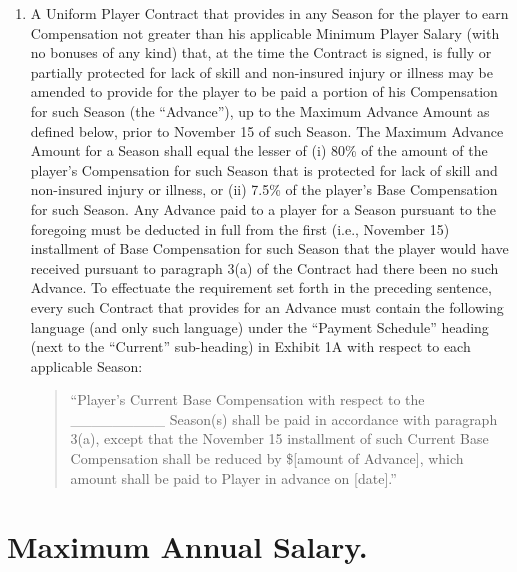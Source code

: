 \documentclass[
]{book}
\begin{document}
\begin{enumerate}
\item
  A Uniform Player Contract that provides in any Season for the player to earn Compensation not greater than his applicable Minimum Player Salary (with no bonuses of any kind) that, at the time the Contract is signed, is fully or partially protected for lack of skill and non-insured injury or illness may be amended to provide for the player to be paid a portion of his Compensation for such Season (the ``Advance''), up to the Maximum Advance Amount as defined below, prior to November 15 of such Season. The Maximum Advance Amount for a Season shall equal the lesser of (i) 80\% of the amount of the player's Compensation for such Season that is protected for lack of skill and non-insured injury or illness, or (ii) 7.5\% of the player's Base Compensation for such Season. Any Advance paid to a player for a Season pursuant to the foregoing must be deducted in full from the first (i.e., November 15) installment of Base Compensation for such Season that the player would have received pursuant to paragraph 3(a) of the Contract had there been no such Advance. To effectuate the requirement set forth in the preceding sentence, every such Contract that provides for an Advance must contain the following language (and only such language) under the ``Payment Schedule'' heading (next to the ``Current'' sub-heading) in Exhibit 1A with respect to each applicable Season:

  \begin{quote}
  ``Player's Current Base Compensation with respect to the \_\_\_\_\_\_\_\_\_ Season(s) shall be paid in accordance with paragraph 3(a), except that the November 15 installment of such Current Base Compensation shall be reduced by \${[}amount of Advance{]}, which amount shall be paid to Player in advance on {[}date{]}.''
  \end{quote}
\end{enumerate}

\hypertarget{maximum-annual-salary.}{%
\section{Maximum Annual Salary.}\label{maximum-annual-salary.}}
\end{document}
